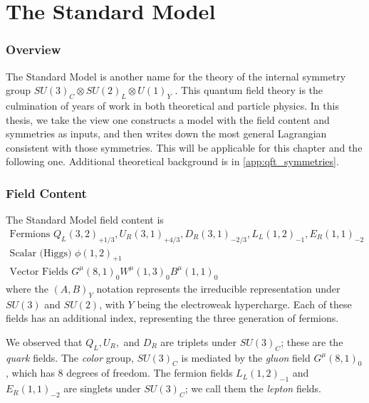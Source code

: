 \chapter{The Standard Model}

\subsection{Overview}


The Standard Model is another name for the theory of the internal symmetry group $SU(3)_C \otimes SU(2)_L \otimes U(1)_Y$ .
This quantum field theory is the culmination of years of work in both theoretical and particle physics.  
In this thesis, we take the view one constructs a model with the field content and symmetries as inputs, and then writes down the most general Lagrangian consistent with those symmetries.
This will be applicable for this chapter and the following one.
Additional theoretical background is in \ref{app:qft_symmetries}.

\subsection{Field Content}

The Standard Model field content is
\begin{equation}
\begin{aligned}
\text{Fermions } Q_L(3,2)_{+1/3}, \xspace  U_R(3,1)_{+4/3},\xspace  D_R(3,1)_{-2/3} ,\xspace  L_L(1,2)_{-1} ,\xspace  E_R(1,1)_{-2}\\
\text{Scalar (Higgs) } \xspace \phi(1,2)_{+1} \\
\text{Vector Fields } \xspace G^\mu(8,1)_0 \xspace W^\mu(1,3)_0  \xspace B^\mu(1,1)_0
\end{aligned}
\end{equation}
where the $(A, B)_Y$ notation represents the irreducible representation under $SU(3)$ and $SU(2)$, with $Y$ being the electroweak hypercharge.
Each of these fields has an additional index, representing the three generation of fermions.

We observed that $Q_L, U_R,$ and $D_R$ are triplets under $SU(3)_C$; these are the \textit{quark} fields.
The \textit{color} group, $SU(3)_C$ is mediated by the \textit{gluon} field $G^\mu(8,1)_0$, which has 8 degrees of freedom.
The fermion fields $L_L(1,2)_{-1}$ and $  E_R(1,1)_{-2} $ are singlets under $SU(3)_C$; we call them the \textit{lepton} fields.

